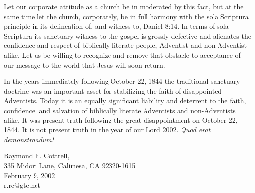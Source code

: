 Let our corporate attitude as a church be in moderated by this fact, but at
the same time let the church, corporately, be in full harmony with the sola
Scriptura principle in its delineation of, and witness to, Daniel 8:14. In
terms of sola Scriptura its sanctuary witness to the gospel is grossly
defective and alienates the confidence and respect of biblically literate
people, Adventist and non-Adventist alike. Let us be willing to recognize
and remove that obstacle to acceptance of our message to the world that
Jesus will soon return.

In the years immediately following October 22, 1844 the traditional
sanctuary doctrine was an important asset for stabilizing the faith of
disappointed Adventists. Today it is an equally significant liability and
deterrent to the faith, confidence, and salvation of biblically literate
Adventists and non-Adventists alike. It was present truth following the
great disappointment on October 22, 1844. It is not present truth in the
year of our Lord 2002. \textit{Quod erat demonstrandum!}

\vspace{1 cm}

Raymond F. Cottrell, \\ 335 Midori Lane, Calimesa, CA 92320-1615 \\ February 9, 2002 \\ r.rc@gte.net
